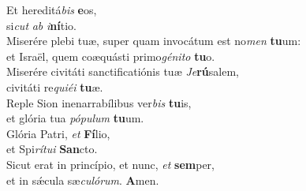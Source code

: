 \oddverse Et hereditá\textit{bis} \textbf{e}os,~\*\\
\oddverse si\textit{cut} \textit{ab} \textit{i}\textbf{ní}tio.\\
\evenverse Miserére plebi tuæ, super quam invocátum est no\textit{men} \textbf{tu}um:~\*\\
\evenverse et Israël, quem coæquásti primo\textit{gé}\textit{ni}\textit{to} \textbf{tu}o.\\
\oddverse Miserére civitáti sanctificatiónis tuæ \textit{Je}\textbf{rú}salem,~\*\\
\oddverse civitáti re\textit{qui}\textit{é}\textit{i} \textbf{tu}æ.\\
\evenverse Reple Sion inenarrabílibus ver\textit{bis} \textbf{tu}is,~\*\\
\evenverse et glória tua \textit{pó}\textit{pu}\textit{lum} \textbf{tu}um.\\
\oddverse Glória Patri, \textit{et} \textbf{Fí}lio,~\*\\
\oddverse et Spi\textit{rí}\textit{tu}\textit{i} \textbf{San}cto.\\
\evenverse Sicut erat in princípio, et nunc, \textit{et} \textbf{sem}per,~\*\\
\evenverse et in sǽcula sæ\textit{cu}\textit{ló}\textit{rum}. \textbf{A}men.\\
